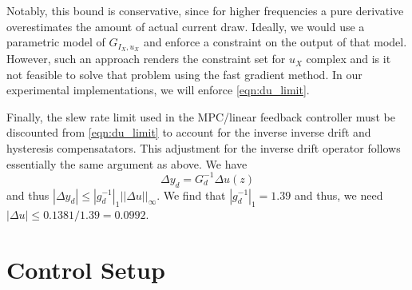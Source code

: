 \documentclass[journal,twocolumn,twoside]{IEEEtran}
\begin{document}
Notably, this bound is conservative, since for higher frequencies a pure derivative overestimates the amount of actual current draw. Ideally, we would use a parametric model of \(G_{I_{X},u_{X}}\) and enforce a constraint on the output of that model. However, such an approach renders the constraint set for $u_X$ complex and is it not feasible to solve that problem using the fast gradient method. In our experimental implementations, we will enforce \eqref{eqn:du_limit}.

Finally, the slew rate limit used in the MPC/linear feedback controller must be discounted from \eqref{eqn:du_limit} to account for the inverse inverse drift and hysteresis compensatators. This adjustment for the inverse drift operator follows essentially the same argument as above. We have
\begin{equation}
\Delta y_d = G_d^{-1} \Delta u(z)
\end{equation}
and thus $|\Delta y_d| \leq |g_d^{-1}|_1 ||\Delta u||_{\infty}$. We find that $|g_d^{-1}|_1  = 1.39$ and thus, we need $|\Delta u| \leq 0.1381/1.39 = 0.0992$.




\section{Control Setup}
\end{document}
